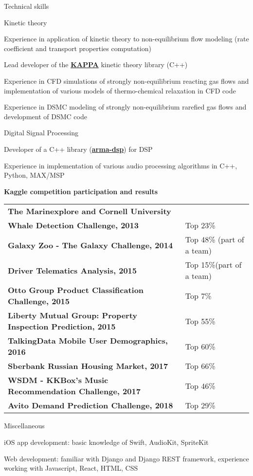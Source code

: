 \documentclass{resume} %
\begin{document}
\begin{rSection}{Technical skills}
\begin{rSubsection}{Kinetic theory}{}{}{}
\item Experience in application of kinetic theory to non-equilibrium flow modeling (rate coefficient and transport properties computation)
\item Lead developer of the {\bf \href{http://ftp.servcbo.com/1707EUCASS/FullPapers/FP_EUCASS-547.pdf}{KAPPA}} kinetic theory library (C++)
\item Experience in CFD simulations of strongly non-equilibrium reacting gas flows and implementation of various models of thermo-chemical relaxation in CFD code
\item Experience in DSMC modeling of strongly non-equilibrium rarefied gas flows and development of DSMC code
\end{rSubsection}

\begin{rSubsection}{Digital Signal Processing}{}{}{}
\item Developer of a C++ library ({\bf \href{https://github.com/knstmrd/arma-dsp}{arma-dsp}}) for DSP
\item Experience in implementation of various audio processing algorithms in C++, Python, MAX/MSP
\end{rSubsection}

{\bf Kaggle competition participation and results}

\begin{tabular}{ @{} >{\bfseries}l @{\hspace{6ex}} l }
The Marinexplore and Cornell University & \\
Whale Detection Challenge, 2013 & Top 23\% \\
Galaxy Zoo - The Galaxy Challenge, 2014 & Top 48\% (part of a team) \\
Driver Telematics Analysis, 2015 & Top 15\%(part of a team) \\ 
Otto Group Product Classification Challenge, 2015 & Top 7\% \\ 
Liberty Mutual Group: Property Inspection Prediction, 2015 & Top 55\% \\
TalkingData Mobile User Demographics, 2016 & Top 60\% \\
Sberbank Russian Housing Market, 2017 & Top 66\% \\
WSDM - KKBox's Music Recommendation Challenge, 2017 & Top 46\% \\
Avito Demand Prediction Challenge, 2018 & Top 29\%
\end{tabular}

\begin{rSubsection}{Miscellaneous}{}{}{}
\item iOS app development: basic knowledge of Swift, AudioKit, SpriteKit
\item Web development: familiar with Django and Django REST framework, experience working with Javascript, React, HTML, CSS
\end{rSubsection}

\end{rSection}
\end{document}
